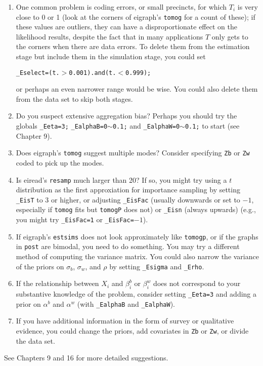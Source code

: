 \documentclass[11pt,titlepage]{article}
\begin{document}
\begin{enumerate}
\item One common problem is coding errors, or small precincts, for
  which $T_i$ is very close to 0 or 1 (look at the corners of
  eigraph's \texttt{tomog} for a count of these); if these values are
  outliers, they can have a disproportionate effect on the likelihood
  results, despite the fact that in many applications $T$ only gets to
  the corners when there are data errors.  To delete them from the
  estimation stage but include them in the simulation stage, you could
  set
  \begin{center}
    \texttt{\_Eselect=(t.$>$0.001).and(t.$<$0.999);}
  \end{center}
  or perhaps an even narrower range would be wise.  You could also
  delete them from the data set to skip both stages.

\item Do you suspect extensive aggregation bias?  Perhaps you should
  try the globals \texttt{\_Eeta=3;} \texttt{\_EalphaB=0$\sim$0.1;}
  and \texttt{\_EalphaW=0$\sim$0.1;} to start (see Chapter 9).

\item Does eigraph's \texttt{tomog} suggest multiple modes?  Consider
  specifying \texttt{Zb} or \texttt{Zw} coded to pick up the modes.

\item Is eiread's \texttt{resamp} much larger than 20?  If so, you
  might try using a $t$ distribution as the first approxiation for
  importance sampling by setting \texttt{\_EisT} to 3 or higher, or
  adjusting \texttt{\_EisFac} (usually downwards or set to $-1$,
  especially if \texttt{tomog} fits but \texttt{tomogP} does not) or
  \texttt{\_Eisn} (always upwards) (e.g., you might try
  \texttt{\_EisFac=1} or \texttt{\_EisFac=$-1$}).

\item If eigraph's \texttt{estsims} does not look approximately like
  \texttt{tomogp}, or if the graphs in \texttt{post} are bimodal, you
  need to do something.  You may try a different method of computing
  the variance matrix.  You could also narrow the variance of the
  priors on $\sigma_b$, $\sigma_w$, and $\rho$ by setting
  \texttt{\_Esigma} and \texttt{\_Erho}.

\item If the relationship between $X_i$ and $\beta_i^b$ or $\beta_i^w$
  does not correspond to your substantive knowledge of the problem,
  consider setting \texttt{\_Eeta=3} and adding a prior on $\alpha^b$
  and $\alpha^w$ (with \texttt{\_EalphaB} and \texttt{\_EalphaW}).

\item If you have additional information in the form of survey or
  qualitative evidence, you could change the priors, add covariates in
  \texttt{Zb} or \texttt{Zw}, or divide the data set.
\end{enumerate}
See Chapters 9 and 16 for more detailed suggestions.
\end{document}
